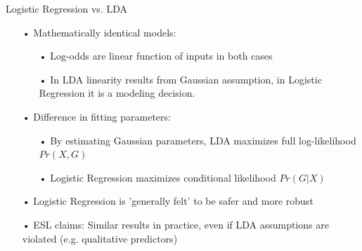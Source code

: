 \documentclass{beamer}
\begin{document}
\begin{frame}{Logistic Regression vs. LDA}
\begin{itemize}
\item[•] Mathematically identical models:
\begin{itemize}
\item[•] Log-odds are linear function of inputs in both cases
\item[•] In LDA linearity results from
Gaussian assumption, in Logistic Regression it is a modeling decision.
\end{itemize}
\item[•] Difference in fitting parameters: 
\begin{itemize}
\item[•] By estimating Gaussian parameters, LDA maximizes full log-likelihood $Pr(X,G)$
\item[•] Logistic Regression maximizes conditional likelihood $Pr(G|X)$
\end{itemize}
\item[•] Logistic Regression is 'generally felt' to be safer and more robust
\item[•] ESL claims: Similar results in practice, even if LDA assumptions are violated (e.g. qualitative predictors)
\end{itemize}
\end{frame}
\end{document}
